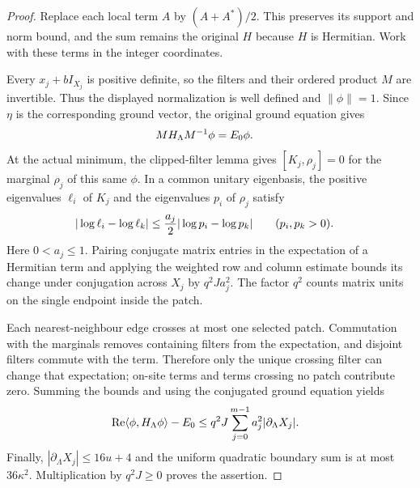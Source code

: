 \begin{proof}
    Replace each local term $A$ by $(A+A^*)/2$. This preserves its support
    and norm bound, and the sum remains the original $H$ because $H$ is
    Hermitian. Work with these terms in the integer coordinates.

    Every $x_j+bI_{X_j}$ is positive definite, so the filters and their
    ordered product $M$ are invertible. Thus the displayed normalization is
    well defined and $\|\phi\|=1$. Since $\eta$ is the corresponding ground
    vector, the original ground equation gives
    \begin{align}
         & MH_\Lambda M^{-1}\phi=E_0\phi. \notag
    \end{align}
    At the actual minimum, the clipped-filter lemma gives
    $[K_j,\rho_j]=0$ for the marginal $\rho_j$ of this same $\phi$.
    In a common unitary eigenbasis, the positive eigenvalues $\ell_i$ of
    $K_j$ and the eigenvalues $p_i$ of $\rho_j$ satisfy
    \begin{align}
         & |\log\ell_i-\log\ell_k|
        \leq\frac{a_j}{2}|\log p_i-\log p_k|
        \qquad(p_i,p_k>0). \notag
    \end{align}
    Here $0<a_j\leq1$. Pairing conjugate matrix entries in the expectation
    of a Hermitian term and applying the weighted row and column estimate
    bounds its change under conjugation across $X_j$ by $q^2J a_j^2$.
    The factor $q^2$ counts matrix units on the single endpoint inside the
    patch.

    Each nearest-neighbour edge crosses at most one selected patch.
    Commutation with the marginals removes containing filters from the
    expectation, and disjoint filters commute with the term. Therefore
    only the unique crossing filter can change that expectation; on-site
    terms and terms crossing no patch contribute zero. Summing the bounds
    and using the conjugated ground equation yields
    \begin{align}
         & \operatorname{Re}\langle\phi,H_\Lambda\phi\rangle-E_0
        \leq q^2J\sum_{j=0}^{m-1}a_j^2|\partial_\Lambda X_j|. \notag
    \end{align}
    Finally, $|\partial_\Lambda X_j|\leq16u+4$ and the uniform quadratic
    boundary sum is at most $36\kappa^2$. Multiplication by $q^2J\geq0$
    proves the assertion.
\end{proof}
